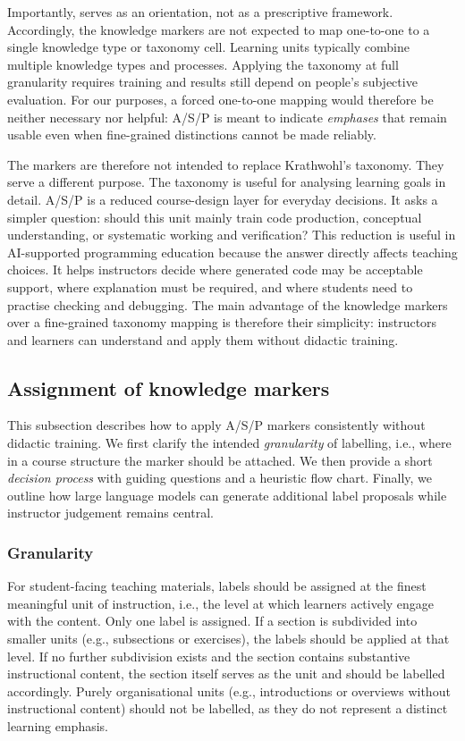 \documentclass{article}
\begin{document}
Importantly,  serves as an orientation, not as a prescriptive framework. Accordingly, the knowledge markers are not expected to map one-to-one to a single knowledge type or taxonomy cell. Learning units typically combine multiple knowledge types and processes. Applying the taxonomy at full granularity requires training and results still depend on people's subjective evaluation. For our purposes, a forced one-to-one mapping would therefore be neither necessary nor helpful: A/S/P is meant to indicate \emph{emphases} that remain usable even when fine-grained distinctions cannot be made reliably.\par

The markers are therefore not intended to replace Krathwohl's taxonomy. They serve a different purpose. The taxonomy is useful for analysing learning goals in detail. A/S/P is a reduced course-design layer for everyday decisions. It asks a simpler question: should this unit mainly train code production, conceptual understanding, or systematic working and verification? This reduction is useful in AI-supported programming education because the answer directly affects teaching choices. It helps instructors decide where generated code may be acceptable support, where explanation must be required, and where students need to practise checking and debugging. The main advantage of the knowledge markers over a fine-grained taxonomy mapping is therefore their simplicity: instructors and learners can understand and apply them without didactic training.\par



\subsection{Assignment of knowledge markers}

This subsection describes how to apply A/S/P markers consistently without didactic training. We first clarify the intended \emph{granularity} of labelling, i.e., where in a course structure the marker should be attached. We then provide a short \emph{decision process} with guiding questions and a heuristic flow chart. Finally, we outline how large language models can generate additional label proposals while instructor judgement remains central.


\subsubsection{Granularity}
For student-facing teaching materials, labels should be assigned at the finest meaningful unit of instruction, i.e., the level at which learners actively engage with the content. Only one label is assigned.
%
If a section is subdivided into smaller units (e.g., subsections or exercises), the labels should be applied at that level. If no further subdivision exists and the section contains substantive instructional content, the section itself serves as the unit and should be labelled accordingly. 
%
Purely organisational units (e.g., introductions or overviews without instructional content) should not be labelled, as they do not represent a distinct learning emphasis.
\end{document}
